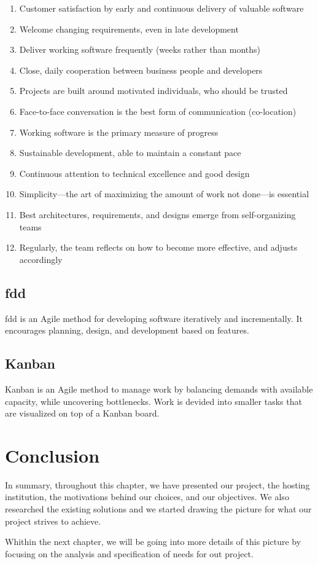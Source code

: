 \begin{enumerate}
	\item Customer satisfaction by early and continuous delivery of valuable software
	\item Welcome changing requirements, even in late development
	\item Deliver working software frequently (weeks rather than months)
	\item Close, daily cooperation between business people and developers
	\item Projects are built around motivated individuals, who should be trusted
	\item Face-to-face conversation is the best form of communication (co-location)
	\item Working software is the primary measure of progress
	\item Sustainable development, able to maintain a constant pace
	\item Continuous attention to technical excellence and good design
	\item Simplicity—the art of maximizing the amount of work not done—is essential
	\item Best architectures, requirements, and designs emerge from self-organizing teams
	\item Regularly, the team reflects on how to become more effective, and adjusts accordingly
\end{enumerate}

\subsection{\acrlong{fdd}}

\acrfull{fdd} is an Agile method for developing software iteratively and incrementally. It encourages planning, design, and development based on features.

\subsection{Kanban}

Kanban is an Agile method to manage work by balancing demands with available capacity, while uncovering bottlenecks.
Work is devided into smaller tasks that are visualized on top of a Kanban board.

\section{Conclusion}

In summary, throughout this chapter, we have presented our project, the hosting institution, the motivations behind our choices, and our objectives. We also researched the existing solutions and we started drawing the picture for what our project strives to achieve.

Whithin the next chapter, we will be going into more details of this picture by focusing on the analysis and specification of needs for out project.